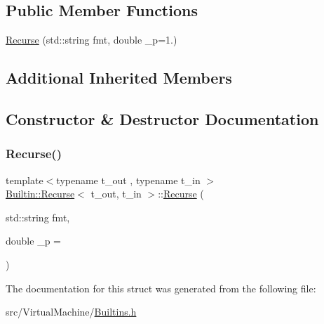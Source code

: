 \subsection*{Public Member Functions}
\begin{DoxyCompactItemize}
\item 
\hyperlink{struct_builtin_1_1_recurse_a1dc3290bbe19caff43bbf6814210033e}{Recurse} (std\+::string fmt, double \+\_\+p=1.)
\end{DoxyCompactItemize}
\subsection*{Additional Inherited Members}


\subsection{Constructor \& Destructor Documentation}
\mbox{\label{struct_builtin_1_1_recurse_a1dc3290bbe19caff43bbf6814210033e}} 
\subsubsection{\texorpdfstring{Recurse()}{Recurse()}}
{\footnotesize\ttfamily template$<$typename t\+\_\+out , typename t\+\_\+in $>$ \\
\hyperlink{struct_builtin_1_1_recurse}{Builtin\+::\+Recurse}$<$ t\+\_\+out, t\+\_\+in $>$\+::\hyperlink{struct_builtin_1_1_recurse}{Recurse} (\begin{DoxyParamCaption}\item[{std\+::string}]{fmt,  }\item[{double}]{\+\_\+p = {} }\end{DoxyParamCaption})\hspace{0.3cm}{\ttfamily [inline]}}



The documentation for this struct was generated from the following file\+:\begin{DoxyCompactItemize}
\item 
src/\+Virtual\+Machine/\hyperlink{_builtins_8h}{Builtins.\+h}\end{DoxyCompactItemize}
